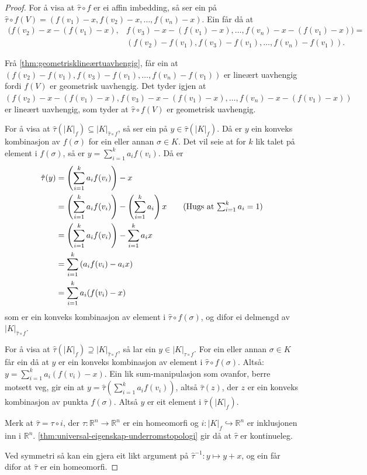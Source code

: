 \documentclass[a4paper, 12pt, norsk]{article}
\theoremstyle{plain}
\theoremstyle{definition}
\newcommand{\Rb}{\mathbb{R}}
\newcommand{\gr}[1]{ \lvert #1 \rvert } %
\newcommand{\tuple}[1]{ \left( #1 \right) } %
\begin{document}
\begin{proof}
	For å visa at \( \hat{\tau} \circ f \) er ei affin imbedding, så ser ein på \( \hat{\tau} \circ f(V) = (f(v_1)-x, f(v_2)-x, \dots, f(v_n)-x) \). Ein får då at 
	\begin{align*}
		(f(v_2)-x-(f(v_1)-x), &f(v_3)-x-(f(v_1)-x), \dots, f(v_n)-x-(f(v_1)-x)) = \\
		&( f(v_2)-f(v_1), f(v_3)-f(v_1), \dots, f(v_n)-f(v_1) ) .
	\end{align*}

	Frå \autoref{thm:geometrisklineærtuavhengig}, får ein at \( ( f(v_2)-f(v_1), f(v_3)-f(v_1), \dots, f(v_n)-f(v_1) ) \) er lineært uavhengig fordi \( f(V) \) er geometrisk uavhengig. Det tyder igjen at \( (f(v_2)-x-(f(v_1)-x), f(v_3)-x-(f(v_1)-x), \dots, f(v_n)-x-(f(v_1)-x)) \) er lineært uavhengig, som tyder at \( \hat{\tau} \circ f(V) \) er geometrisk uavhengig.

	For å visa at \( \hat{\tau}(\gr{K}_f) \subseteq \gr{K}_{\hat{\tau} \circ f} \), så ser ein på \( y \in \hat{\tau}(\gr{K}_f) \). Då er \( y \) ein konveks kombinasjon av \( f(\sigma) \) for ein eller annan \( \sigma \in K \). Det vil seie at for \( k \) lik talet på element i \( f(\sigma) \), så er \( y = \sum_{i=1}^k a_i f(v_i) \). Då er
	\begin{align*}
		\hat{\tau}(y) &= \left(\sum_{i=1}^k a_i f(v_i)\right) - x \\
		&= \left(\sum_{i=1}^k a_i f(v_i)\right)-\left(\sum_{i=1}^k a_i \right)x 
		\tag{Hugs at \( \sum_{i=1}^k a_i = 1 \)} \\
		&= \left(\sum_{i=1}^k a_i f(v_i)\right)-\sum_{i=1}^k a_i x \\
		&= \sum_{i=1}^k \tuple{a_i f(v_i) - a_i x} \\
		&= \sum_{i=1}^k a_i(f(v_i) - x)
	\end{align*}
	som er ein konveks kombinasjon av element i \( \hat{\tau} \circ f(\sigma) \), og difor ei delmengd av \( \gr{K}_{\hat{\tau} \circ f} \).

	For å visa at \( \hat{\tau}(\gr{K}_f) \supseteq \gr{K}_{\hat{\tau} \circ f} \), så lar ein \( y \in \gr{K}_{\hat{\tau} \circ f} \). For ein eller annan \( \sigma \in K \) får ein då at \( y \) er ein konveks kombinasjon av element i \( \hat{\tau}\circ f(\sigma) \). Altså: \(  y = \sum_{i=1}^k a_i (f(v_i) - x) \). Ein lik sum-manipulasjon som ovanfor, berre motsett veg, gir ein at \( y = \hat{\tau}\left(\sum_{i=1}^k a_i f(v_i)\right) \), altså \( \hat{\tau}(z) \), der \( z \) er ein konveks kombinasjon av punkta \( f(\sigma) \). Altså \( y \) er eit element i \( \hat{\tau}(\gr{K}_f) \).

	Merk at \( \hat{\tau} = \tau \circ i \), der \( \tau: \Rb^n \to \Rb^n \) er ein homeomorfi og \( i: \gr{K}_f \hookrightarrow \Rb^n \) er inklusjonen inn i \( \Rb^n \). \autoref{thm:universal-eigenskap-underromstopologi} gir då at \( \hat{\tau} \) er kontinueleg.

	Ved symmetri så kan ein gjera eit likt argument på \( \hat{\tau}^{-1}: y \mapsto y+x \), og ein får difor at \( \hat{\tau} \) er ein homeomorfi.
\end{proof}
\end{document}
